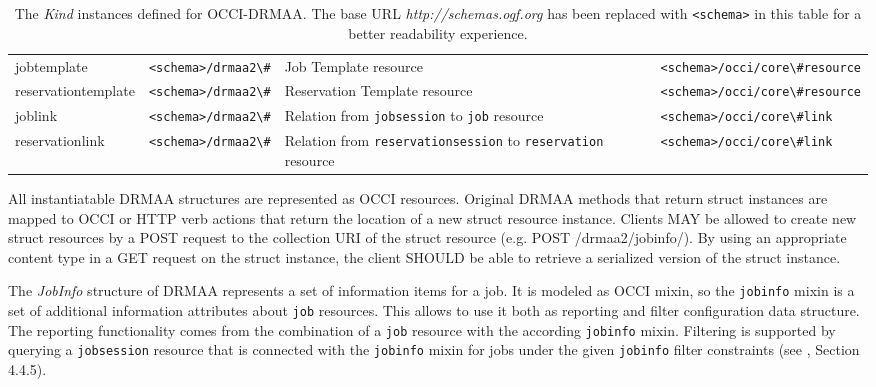 \documentclass[10pt]{article}
\newcommand{\h}[1]{\lstinline|#1|}
\newcommand{\rat}[1]{}
\begin{document}
\begin{table}[ht]
\begin{tabularx}{\textwidth}{|l|l|X|l|}
jobtemplate            & \h{<schema>/drmaa2\#}             & Job Template resource           & \h{<schema>/occi/core\#resource} \\
reservationtemplate    & \h{<schema>/drmaa2\#}             & Reservation Template resource   & \h{<schema>/occi/core\#resource} \\
joblink                & \h{<schema>/drmaa2\#}             & Relation from \h{jobsession} to \h{job} resource & \h{<schema>/occi/core\#link} \\
reservationlink        & \h{<schema>/drmaa2\#}             & Relation from \h{reservationsession} to \h{reservation} resource & \h{<schema>/occi/core\#link} \\
\hline
\end{tabularx}
\caption{The \emph{Kind} instances defined for OCCI-DRMAA.  The base URL \emph{http://schemas.ogf.org} has been replaced with \h{<schema>} in this table for a better readability experience.}
\label{tab:kinddefinitions}
\end{table}

\rat{There was a long debate in the Potsdam F2F meeting about how to map DRMAA structs to OCCI. Due to the possibility of implementation-specific extensions (and for several other reasons), we decided to map DRMAA structs to resources.}

\rat{There was a long debate at OGF 34 if we should model DRMAA templates as serialized structs. This brings potential rendering problems with long OCCI attribute values. Also, the server may want to report differing job templates, which would bloat the \h{job} resource return attributes on every request.}

All instantiatable DRMAA structures are represented as OCCI resources. Original DRMAA methods that return struct instances are mapped to OCCI or HTTP verb actions that return the location of a new struct resource instance. Clients MAY be allowed to create new struct resources by a POST request to the collection URI of the struct resource (e.g. POST /drmaa2/jobinfo/). By using an appropriate content type in a GET request on the struct instance, the client SHOULD be able to retrieve a serialized version of the struct instance.

The \emph{JobInfo} structure of DRMAA represents a set of information items for a job. It is modeled as OCCI mixin, so the \h{jobinfo} mixin is a set of additional information attributes about \h{job} resources. This allows to use it both as reporting and filter configuration data structure. The reporting functionality comes from the combination of a \h{job} resource with the according \h{jobinfo} mixin. Filtering is supported by querying a \h{jobsession} resource that is connected with the \h{jobinfo} mixin for jobs under the given \h{jobinfo} filter constraints (see \cite{gfd183}, Section 4.4.5).
\end{document}

